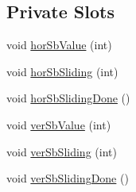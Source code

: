 \subsection*{Private Slots}
\begin{DoxyCompactItemize}
\item 
void \hyperlink{classQtTableView_ae00e62a7ab8c48bae71d9d44333c0747}{hor\+Sb\+Value} (int)
\item 
void \hyperlink{classQtTableView_a6b7a9f6036632777ec4d0aff89a6d174}{hor\+Sb\+Sliding} (int)
\item 
void \hyperlink{classQtTableView_ae737c2532559b214edf50a6a23019e31}{hor\+Sb\+Sliding\+Done} ()
\item 
void \hyperlink{classQtTableView_a51c3598770939f78e760c12da73218b7}{ver\+Sb\+Value} (int)
\item 
void \hyperlink{classQtTableView_a1103a9f08a05a9cc9ebe135cda62a94d}{ver\+Sb\+Sliding} (int)
\item 
void \hyperlink{classQtTableView_a5cae8ae5a932592c4e1d34d1204c980b}{ver\+Sb\+Sliding\+Done} ()
\end{DoxyCompactItemize}
